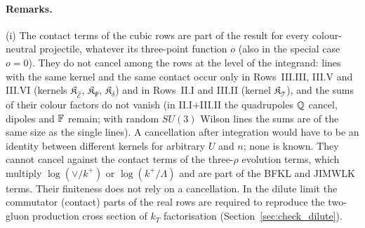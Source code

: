 \paragraph{Remarks.} (i) The contact terms of the cubic rows are part of the result for every colour-neutral projectile, whatever its three-point function $o$ (also in the special case $o=0$). They do not cancel among the rows at the level of the integrand: lines with the same kernel and the same contact occur only in Rows~III.III, III.V and III.VI (kernels $\mathfrak K_{\widehat{\mathcal E}}$, $\mathfrak K_\Psi$, $\mathfrak K_\delta$) and in Rows~II.I and III.II (kernel $\mathfrak K_{\mathcal T}$), and the sums of their colour factors do not vanish (in II.I$+$III.II the quadrupoles $\mathbb{Q}$ cancel, dipoles and $\mathbb{F}$ remain; with random $SU(3)$ Wilson lines the sums are of the same size as the single lines). A cancellation after integration would have to be an identity between different kernels for arbitrary $U$ and $n$; none is known. They cannot cancel against the contact terms of the three-$\rho$ evolution terms, which multiply $\log(\vee/k^+)$ or $\log(k^+/\Lambda)$ and are part of the BFKL and JIMWLK terms. Their finiteness does not rely on a cancellation. In the dilute limit the commutator (contact) parts of the real rows are required to reproduce the two-gluon production cross section of $k_T$ factorisation (Section~\ref{sec:check_dilute}).
